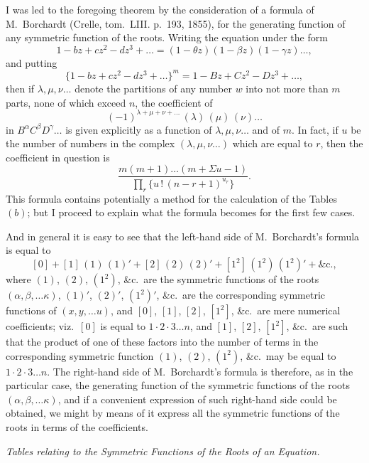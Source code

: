 \documentclass[11pt,a4paper]{book}
\begin{document}
\begin{center}
I was led to the foregoing theorem by the consideration of a formula of
M.~Borchardt (Crelle, tom.~LIII. p.~193, 1855), for the generating function
of any symmetric function of the roots. Writing the equation under the form
\[
1 - bz + cz^2 - dz^3 + \ldots = (1 - \theta z)(1 - \beta z)(1 - \gamma z)\ldots,
\]
and putting
\[
\{1 - bz + cz^2 - dz^3 + \ldots\}^m = 1 - Bz + Cz^2 - Dz^3 + \ldots,
\]
then if $\lambda, \mu, \nu\ldots$ denote the partitions of any number $w$
into not more than $m$ parts, none of which exceed $n$, the coefficient of
\[
(-1)^{\lambda + \mu + \nu + \ldots}\, (\lambda)\, (\mu)\, (\nu) \ldots
\]
in $B^\alpha C^\beta D^\gamma \ldots$ is given explicitly as a function of
$\lambda, \mu, \nu\ldots$ and of $m$. In fact, if $u$ be the number of
numbers in the complex $(\lambda, \mu, \nu\ldots)$ which are equal to $r$,
then the coefficient in question is
\[
\frac{m(m+1)\ldots(m+\Sigma u - 1)}{\prod\limits_r \{u\, !\, (n-r+1)^{u_r}\}}.
\]
This formula contains potentially a method for the calculation of the
Tables~$(b)$; but I proceed to explain what the formula becomes for the first
few cases.

And in general it is easy to see that the left-hand side of M.~Borchardt's
formula is equal to
\[
[0] + [1]\,(1)\,(1)' + [2]\,(2)\,(2)' + [1^2]\,(1^2)\,(1^2)' + \&\text{c.},
\]
where $(1)$, $(2)$, $(1^2)$, \&c.\ are the symmetric functions of the roots
$(\alpha, \beta, \ldots \kappa)$, $(1)'$, $(2)'$, $(1^2)'$, \&c.\ are the
corresponding symmetric functions of $(x, y, \ldots u)$, and $[0]$, $[1]$,
$[2]$, $[1^2]$, \&c.\ are mere numerical coefficients; viz.\ $[0]$ is equal to
$1 \cdot 2 \cdot 3 \ldots n$, and $[1]$, $[2]$, $[1^2]$, \&c.\ are such that the
product of one of these factors into the number of terms in the corresponding
symmetric function $(1)$, $(2)$, $(1^2)$, \&c.\ may be equal to
$1 \cdot 2 \cdot 3 \ldots n$. The right-hand side of M.~Borchardt's formula is
therefore, as in the particular case, the generating function of the symmetric
functions of the roots $(\alpha, \beta, \ldots \kappa)$, and if a convenient
expression of such right-hand side could be obtained, we might by means of it
express all the symmetric functions of the roots in terms of the coefficients.

\begin{center}
\textit{Tables relating to the Symmetric Functions of the Roots of an Equation.}
\end{center}


\end{center}
\end{document}
